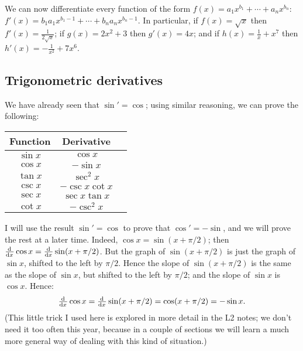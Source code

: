 \begin{ex}
  We can now differentiate every function of the form $ f(x) = a_1 x^{b_1} + \cdots + a_n x^{b_n} $: $ f'(x) = b_1 a_1 x^{b_1 - 1} + \cdots + b_n a_n x^{b_n - 1} $.
  In particular, if $ f(x) = \sqrt{x} $ then $ f'(x) = \frac{1}{2\sqrt{x}} $; if $ g(x) = 2x^2 + 3 $ then $ g'(x) = 4x $; and if $ h(x) = \frac{1}{x} + x^7 $
  then $ h'(x) = -\frac{1}{x^2} + 7x^6 $.
\end{ex}

\subsection{Trigonometric derivatives}
We have already seen that $ \sin' = \cos $; using similar reasoning, we can prove the following:

\begin{thm}
  \def\arraystretch{1.5}
  \begin{tabular}{|c|c|l|}\hline
    \textbf{Function} & \textbf{Derivative} \\\hline
    $ \sin x $ & $ \cos x $\\\hline
    $ \cos x $ & $ -\sin x $\\\hline
    $ \tan x $ & $ \sec^2 x $\\\hline
    $ \csc x $ & $ -\csc x \cot x $\\\hline
    $ \sec x $ & $ \sec x \tan x $\\\hline
    $ \cot x $ & $ -\csc^2 x $\\\hline
  \end{tabular}
\end{thm}

I will use the result $ \sin' = \cos $ to prove that $ \cos' = -\sin $, and we will prove
the rest at a later time. Indeed, $ \cos x = \sin (x + \pi/2) $; then $ \od{}{x} \cos x = \od{}{x} \sin(x + \pi/2) $.
But the graph of $ \sin(x + \pi/2) $ is just the graph of $ \sin x $, shifted to the left
by $ \pi/2 $. Hence the slope of $ \sin (x + \pi/2) $ is the same as the slope of $ \sin x $,
but shifted to the left by $ \pi/2 $; and the slope of $ \sin x $ is $ \cos x $. Hence:
\begin{equation}
  \od{}{x} \cos x = \od{}{x} \sin(x + \pi/2) = \cos(x + \pi/2) = -\sin x.
\end{equation}
(This little trick I used here is explored in more detail in the L2 notes; we don't need it
too often this year, because in a couple of sections we will learn a much more general way
of dealing with this kind of situation.)

